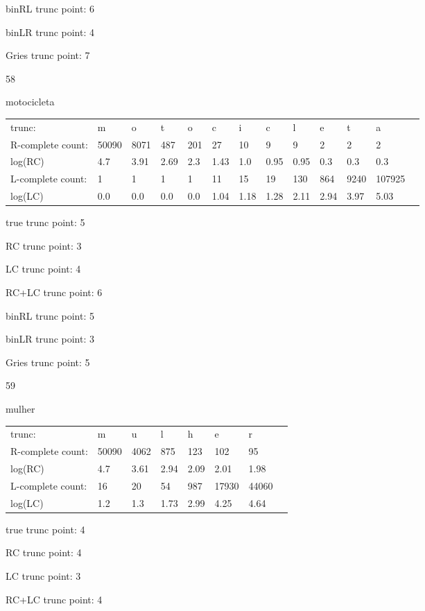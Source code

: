 \documentclass[10pt]{article}
\begin{document}
binRL trunc point: 6

binLR trunc point: 4

Gries trunc point: 7

\vspace{1em}

58

motocicleta

\begin{tabular}{l|llllllllllll}
trunc: & m & o & t & o & c & i & c & l & e & t & a & \\ 
R-complete count: & 50090 & 8071 & 487 & 201 & 27 & 10 & 9 & 9 & 2 & 2 & 2 & \\ 
log(RC) & 4.7 & 3.91 & 2.69 & 2.3 & 1.43 & 1.0 & 0.95 & 0.95 & 0.3 & 0.3 & 0.3 & \\ 
L-complete count: & 1 & 1 & 1 & 1 & 11 & 15 & 19 & 130 & 864 & 9240 & 107925 & \\ 
log(LC) & 0.0 & 0.0 & 0.0 & 0.0 & 1.04 & 1.18 & 1.28 & 2.11 & 2.94 & 3.97 & 5.03 & \\ 
\end{tabular}

true trunc point: 5

RC trunc point: 3

LC trunc point: 4

RC+LC trunc point: 6

binRL trunc point: 5

binLR trunc point: 3

Gries trunc point: 5

\vspace{1em}

59

mulher

\begin{tabular}{l|lllllll}
trunc: & m & u & l & h & e & r & \\ 
R-complete count: & 50090 & 4062 & 875 & 123 & 102 & 95 & \\ 
log(RC) & 4.7 & 3.61 & 2.94 & 2.09 & 2.01 & 1.98 & \\ 
L-complete count: & 16 & 20 & 54 & 987 & 17930 & 44060 & \\ 
log(LC) & 1.2 & 1.3 & 1.73 & 2.99 & 4.25 & 4.64 & \\ 
\end{tabular}

true trunc point: 4

RC trunc point: 4

LC trunc point: 3

RC+LC trunc point: 4
\end{document}
